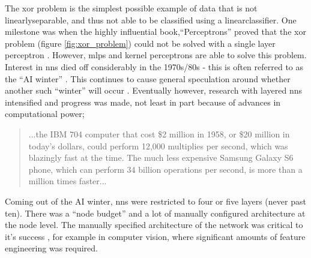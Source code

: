 The \gls{xor} problem is the simplest possible example of data that is not \gls{linearlyseparable}, and thus not able to be classified using a \gls{linearclassifier}. One milestone was when the highly influential book,\enquote{Perceptrons} proved that the \gls{xor} problem (figure \ref{fig:xor_problem}) could not be solved with a single layer perceptron \cite[Chapter~4]{perceptron_book}. However, \gls{mlp}s and kernel perceptrons are able to solve this problem. Interest in \gls{nn}s died off considerably in the 1970s/80s - this is often referred to as the \enquote{AI winter} \cite{ai_winter}. This continues to cause general speculation around whether another such \enquote{winter} will occur \cite{ai_winter_spec}. Eventually however, research with layered \gls{nn}s intensified and progress was made, not least in part because of advances in computational power;  \bigskip


\begin{quote}
...the IBM 704 computer that cost \$2 million in 1958, or \$20 million in today’s dollars, could perform 12,000 multiplies per second, which was blazingly fast at the time. The much less expensive Samsung Galaxy S6 phone, which can perform 34 billion operations per second, is more than a million times faster...\cite{unreasonable_dl}
\end{quote}

\bigskip
Coming out of the AI winter, \gls{nn}s were restricted to four or five layers (never past ten). There was a \enquote{node budget} and a lot of manually configured architecture at the node level. The manually specified architecture of the network was critical to it's success \cite{manual_architecture}, for example in computer vision, where significant amounts of feature engineering was required. 
\bigskip


